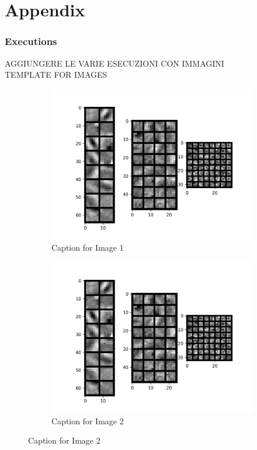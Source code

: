\documentclass{report}
\begin{document}
\pagebreak

\part{Appendix}
\appendix

\section{Executions}
AGGIUNGERE LE VARIE ESECUZIONI CON IMMAGINI\\

TEMPLATE FOR IMAGES

\begin{figure}[t!]
  \centering
  \hspace{-2cm}
  \begin{subfigure}[t]{0.49\textwidth}
    \centering
    \includegraphics[width=1.3\textwidth]{3.CNN_500_sample/CNN_filters.png}
    \caption{Caption for Image 1}
    \label{fig:image-set1-sub1}
  \end{subfigure}
  \hspace{-0.5cm}
  \begin{subfigure}[t]{0.49\textwidth}
    \centering
    \includegraphics[width=1.3\textwidth]{3.CNN_500_sample/CNN_filters.png}
    \caption{Caption for Image 2}
    \label{fig:image-set1-sub2}
  \end{subfigure}


\end{figure}
\end{document}
